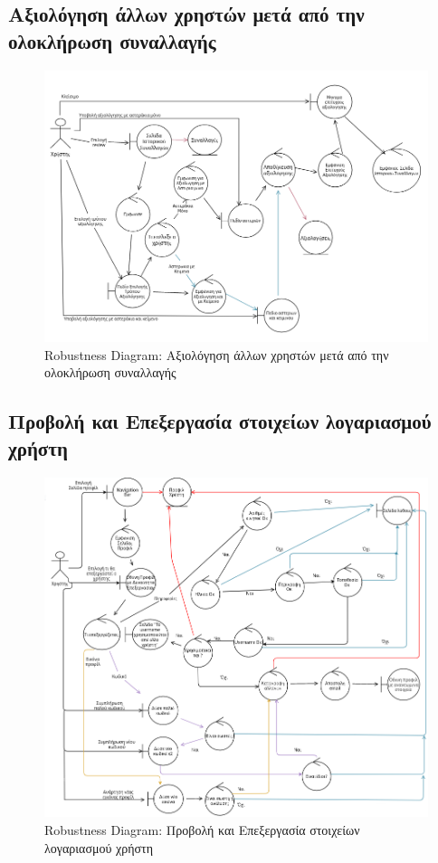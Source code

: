 \documentclass[12pt,a4paper]{article}
\begin{document}
\subsection{Αξιολόγηση άλλων χρηστών μετά από την ολοκλήρωση συναλλαγής}
\begin{figure}[H]
	\includegraphics[width=\textwidth]{Review after Transaction Robustness.png}
	\caption{Robustness Diagram: Αξιολόγηση άλλων χρηστών μετά από την ολοκλήρωση συναλλαγής}
	\label{Robustness Diagram: Αξιολόγηση άλλων χρηστών μετά από την ολοκλήρωση συναλλαγής}
\end{figure}


\subsection{Προβολή και Επεξεργασία στοιχείων λογαριασμού χρήστη}
\begin{figure}[H]
	\includegraphics[width=\textwidth]{View and Edit User Account Details Robustness.png}
	\caption{Robustness Diagram: Προβολή και Επεξεργασία στοιχείων λογαριασμού χρήστη}
	\label{Robustness Diagram: Προβολή και Επεξεργασία στοιχείων λογαριασμού χρήστη}
\end{figure}
\end{document}

